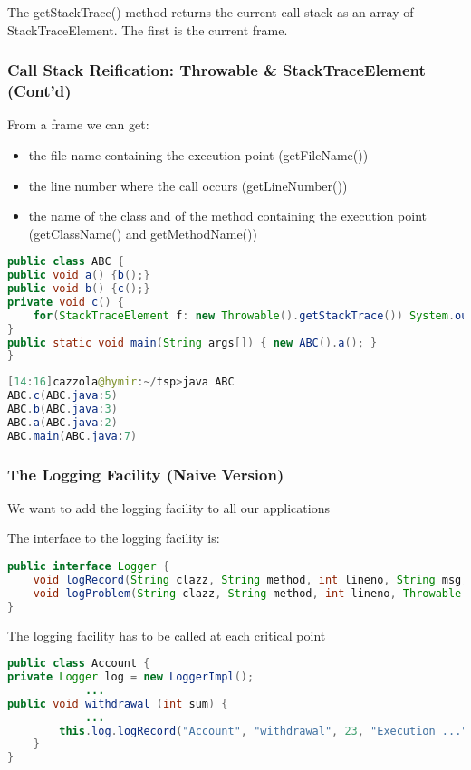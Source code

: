 The getStackTrace() method returns the current call stack as an array of StackTraceElement. The first is the current frame.

\subsubsection{Call Stack Reification: Throwable \& StackTraceElement (Cont'd)}
From a frame we can get:
\begin{itemize}
	\item the file name containing the execution point (getFileName())
	\item the line number where the call occurs (getLineNumber())
	\item the name of the class and of the method containing the execution point (getClassName() and getMethodName())
\end{itemize}

\begin{lstlisting}[language=Java]
public class ABC {
public void a() {b();}
public void b() {c();}
private void c() {
	for(StackTraceElement f: new Throwable().getStackTrace()) System.out.println(f);
}
public static void main(String args[]) { new ABC().a(); }
}
\end{lstlisting}

\begin{lstlisting}[language=Java]
[14:16]cazzola@hymir:~/tsp>java ABC
ABC.c(ABC.java:5)
ABC.b(ABC.java:3)
ABC.a(ABC.java:2)
ABC.main(ABC.java:7)
\end{lstlisting}

\subsubsection{The Logging Facility (Naive Version)}
We want to add the logging facility to all our applications

The interface to the logging facility is:

\begin{lstlisting}[language=Java]
public interface Logger {
	void logRecord(String clazz, String method, int lineno, String msg, int type);
	void logProblem(String clazz, String method, int lineno, Throwable prob);
}
\end{lstlisting}

The logging facility has to be called at each critical point

\begin{lstlisting}[language=Java]
public class Account {
private Logger log = new LoggerImpl();
			...
public void withdrawal (int sum) {
			...
		this.log.logRecord("Account", "withdrawal", 23, "Execution ...", 0);
	}
}
\end{lstlisting}

